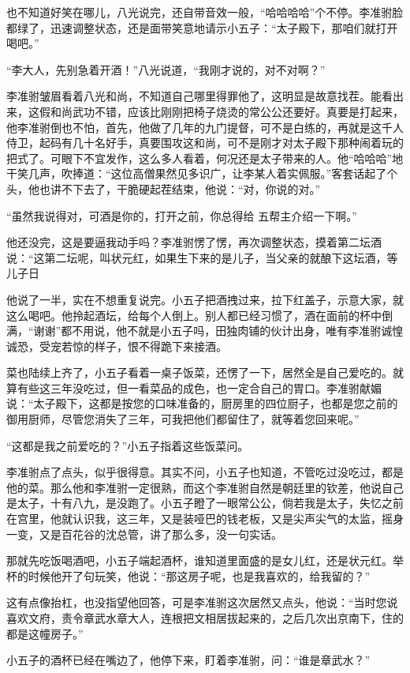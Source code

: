 也不知道好笑在哪儿，八光说完，还自带音效一般，“哈哈哈哈”个不停。李准驸脸都绿了，迅速调整状态，还是面带笑意地请示小五子：“太子殿下，那咱们就打开喝吧。”

“李大人，先别急着开酒！”八光说道，“我刚才说的，对不对啊？”

李准驸皱眉看着八光和尚，不知道自己哪里得罪他了，这明显是故意找茬。能看出来，这假和尚武功不错，应该比刚刚把椅子烧烫的常公公还要好。真要是打起来，他李准驸倒也不怕，首先，他做了几年的九门提督，可不是白练的，再就是这千人侍卫，起码有几十名好手，真要围攻这和尚，可不是刚才对太子殿下那种闹着玩的把式了。可眼下不宜发作，这么多人看着，何况还是太子带来的人。他“哈哈哈”地干笑几声，吹捧道：“这位高僧果然见多识广，让李某人着实佩服。”客套话起了个头，他也讲不下去了，干脆硬起茬结束，他说：“对，你说的对。”

“虽然我说得对，可酒是你的，打开之前，你总得给
五帮主介绍一下啊。”

他还没完，这是要逼我动手吗？李准驸愣了愣，再次调整状态，摸着第二坛酒说：“这第二坛呢，叫状元红，如果生下来的是儿子，当父亲的就酿下这坛酒，等儿子日

他说了一半，实在不想重复说完。小五子把酒拽过来，拉下红盖子，示意大家，就这么喝吧。他拎起酒坛，给每个人倒上。别人都已经习惯了，酒在面前的杯中倒满，“谢谢”都不用说，他不就是小五子吗，田独肉铺的伙计出身，唯有李准驸诚惶诚恐，受宠若惊的样子，恨不得跪下来接酒。

菜也陆续上齐了，小五子看着一桌子饭菜，还愣了一下，居然全是自己爱吃的。就算有些这三年没吃过，但一看菜品的成色，也一定合自己的胃口。李准驸献媚说：“太子殿下，这都是按您的口味准备的，厨房里的四位厨子，也都是您之前的御用厨师，尽管您消失了三年，可我把他们都留住了，就等着您回来呢。”

“这都是我之前爱吃的？”小五子指着这些饭菜问。

李准驸点了点头，似乎很得意。其实不问，小五子也知道，不管吃过没吃过，都是他的菜。那么他和李准驸一定很熟，而这个李准驸自然是朝廷里的钦差，他说自己是太子，十有八九，是没跑了。小五子瞪了一眼常公公，倘若我是太子，失忆之前在宫里，他就认识我，这三年，又是装哑巴的钱老板，又是尖声尖气的太监，摇身一变，又是百花谷的沈总管，讲了那么多，没一句实话。

那就先吃饭喝酒吧，小五子端起酒杯，谁知道里面盛的是女儿红，还是状元红。举杯的时候他开了句玩笑，他说：“那这房子呢，也是我喜欢的，给我留的？”

这有点像抬杠，也没指望他回答，可是李准驸这次居然又点头，他说：“当时您说喜欢文府，责令章武水章大人，连根把文相居拔起来的，之后几次出京南下，住的都是这幢房子。”

小五子的酒杯已经在嘴边了，他停下来，盯着李准驸，问：“谁是章武水？”


